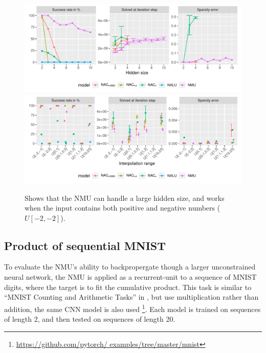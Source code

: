 \begin{figure}[h]
\centering
\includegraphics[width=\linewidth,trim={0 1.3cm 0 0},clip]{results/simple_function_static_mul_hidden_size.pdf}
\includegraphics[width=\linewidth,trim={0 0 0 0.809cm},clip]{results/simple_function_static_mul_range.pdf}
\caption{Shows that the NMU can handle a large hidden size, and works when the input contains both positive and negative numbers ($U[-2,-2]$).} 
\label{fig:simple-function-static-theoreical-claims-experiment}
\end{figure}

\subsection{Product of sequential MNIST}

To evaluate the NMU's ability to backpropergate though a larger unconstrained neural network, the NMU is applied as a recurrent-unit to a sequence of MNIST digits, where the target is to fit the cumulative product. This task is similar to ``MNIST Counting and Arithmetic Tasks'' in \cite{trask-nalu}, but use multiplication rather than addition, the same CNN model is also used \footnote{\url{https://github.com/pytorch/
examples/tree/master/mnist}}. Each model is trained on sequences of length 2, and then tested on sequences of length 20.

